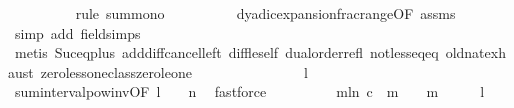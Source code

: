 \begin{isabellebody}
\ \ \ \ \ \ \ \ \isamarkupfalse%
\ {\isacharparenleft}{\kern0pt}rule\ sum{\isacharunderscore}{\kern0pt}mono{\isacharparenright}{\kern0pt}\isanewline
\ \ \ \ \ \ \ \ \isamarkupfalse%
\ dyadic{\isacharunderscore}{\kern0pt}expansion{\isacharunderscore}{\kern0pt}frac{\isacharunderscore}{\kern0pt}range{\isacharbrackleft}{\kern0pt}OF\ assms{\isacharparenleft}{\kern0pt}{}{\isacharparenright}{\kern0pt}{\isacharbrackright}{\kern0pt}\ \isamarkupfalse%
\ {\isacharparenleft}{\kern0pt}simp\ add{\isacharcolon}{\kern0pt}\ field{\isacharunderscore}{\kern0pt}simps{\isacharparenright}{\kern0pt}\isanewline
\ \ \ \ \ \ \ \ \isamarkupfalse%
\ {\isacharparenleft}{\kern0pt}metis\ Suc{\isacharunderscore}{\kern0pt}eq{\isacharunderscore}{\kern0pt}plus{}\ add{\isacharunderscore}{\kern0pt}diff{\isacharunderscore}{\kern0pt}cancel{\isacharunderscore}{\kern0pt}left{\isacharprime}{\kern0pt}\ diff{\isacharunderscore}{\kern0pt}le{\isacharunderscore}{\kern0pt}self\ dual{\isacharunderscore}{\kern0pt}order{\isachardot}{\kern0pt}refl\ not{\isacharunderscore}{\kern0pt}less{\isacharunderscore}{\kern0pt}eq{\isacharunderscore}{\kern0pt}eq\ old{\isachardot}{\kern0pt}nat{\isachardot}{\kern0pt}exhaust\ zero{\isacharunderscore}{\kern0pt}less{\isacharunderscore}{\kern0pt}one{\isacharunderscore}{\kern0pt}class{\isachardot}{\kern0pt}zero{\isacharunderscore}{\kern0pt}le{\isacharunderscore}{\kern0pt}one{\isacharparenright}{\kern0pt}\isanewline
\ \ \ \ \ \ \isamarkupfalse%
\ \isamarkupfalse%
\ {\isachardoublequoteopen}{\isachardot}{\kern0pt}{\isachardot}{\kern0pt}{\isachardot}{\kern0pt}\ {\isacharless}{\kern0pt}\ {}\ {\isacharslash}{\kern0pt}\ {}\ {\isacharcircum}{\kern0pt}\ {\isacharparenleft}{\kern0pt}l{\isacharplus}{\kern0pt}{}{\isacharparenright}{\kern0pt}{\isachardoublequoteclose}\isanewline
\ \ \ \ \ \ \ \ \isamarkupfalse%
\ sum{\isacharunderscore}{\kern0pt}interval{\isacharunderscore}{\kern0pt}pow{}{\isacharunderscore}{\kern0pt}inv{\isacharbrackleft}{\kern0pt}OF\ {\isacartoucheopen}l\ {\isacharplus}{\kern0pt}\ {}\ {\isacharless}{\kern0pt}\ n{\isacartoucheclose}{\isacharbrackright}{\kern0pt}\ \isamarkupfalse%
\ fastforce\isanewline
\ \ \ \ \ \ \isamarkupfalse%
\ \isamarkupfalse%
\ {\isachardoublequoteopen}{\isacharparenleft}{\kern0pt}{\isasymSum}m{\isasymin}{\isacharbraceleft}{\kern0pt}l{\isacharplus}{\kern0pt}{}{\isachardot}{\kern0pt}{\isachardot}{\kern0pt}n{\isacharbraceright}{\kern0pt}{\isachardot}{\kern0pt}\ {\isacharparenleft}{\kern0pt}c\ {\isacharbang}{\kern0pt}\ {\isacharparenleft}{\kern0pt}m{\isacharminus}{\kern0pt}{}{\isacharparenright}{\kern0pt}{\isacharparenright}{\kern0pt}\ {\isacharslash}{\kern0pt}\ {}\ {\isacharcircum}{\kern0pt}\ m{\isacharparenright}{\kern0pt}\ {\isacharless}{\kern0pt}\ {}\ {\isacharslash}{\kern0pt}\ {}\ {\isacharcircum}{\kern0pt}\ {\isacharparenleft}{\kern0pt}l{\isacharplus}{\kern0pt}{}{\isacharparenright}{\kern0pt}{\isachardoublequoteclose}\ \isacommand{{\isachardot}{\kern0pt}}\isamarkupfalse%

\end{isabellebody}
